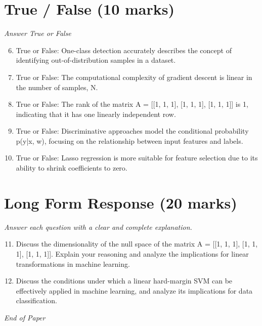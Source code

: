 \documentclass[12pt]{article}
\begin{document}
\section*{True / False (10 marks)}
\textit{Answer True or False}
\begin{enumerate}[label=\arabic*.]
\setcounter{enumi}{5}
\item True or False: One-class detection accurately describes the concept of identifying out-of-distribution samples in a dataset.
\item True or False: The computational complexity of gradient descent is linear in the number of samples, N.
\item True or False: The rank of the matrix A = [[1, 1, 1], [1, 1, 1], [1, 1, 1]] is 1, indicating that it has one linearly independent row.
\item True or False: Discriminative approaches model the conditional probability p(y|x, w), focusing on the relationship between input features and labels.
\item True or False: Lasso regression is more suitable for feature selection due to its ability to shrink coefficients to zero.
\end{enumerate}

\section*{Long Form Response (20 marks)}
\textit{Answer each question with a clear and complete explanation.}
\begin{enumerate}[label=\arabic*.]
\setcounter{enumi}{10}
\item Discuss the dimensionality of the null space of the matrix A = [[1, 1, 1], [1, 1, 1], [1, 1, 1]]. Explain your reasoning and analyze the implications for linear transformations in machine learning.
\item Discuss the conditions under which a linear hard-margin SVM can be effectively applied in machine learning, and analyze its implications for data classification.
\end{enumerate}

\vfill
\noindent\textit{End of Paper}
\end{document}
